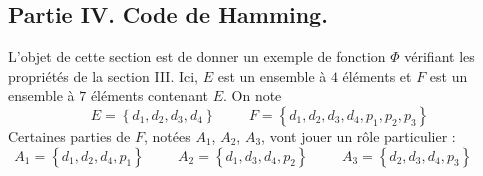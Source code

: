 \subsection*{Partie IV. Code de Hamming.}
L'objet de cette section est de donner un exemple de fonction $\Phi$ vérifiant les propriétés de la section III. Ici, $E$ est un ensemble à $4$ éléments et $F$ est un ensemble à $7$ éléments contenant $E$. On note
\begin{displaymath}
 E = \left\lbrace d_1,d_2,d_3,d_4\right\rbrace \hspace{1cm} F= \left\lbrace d_1,d_2,d_3,d_4,p_1,p_2,p_3\right\rbrace 
\end{displaymath}
Certaines parties de $F$, notées $A_1$, $A_2$, $A_3$, vont jouer un rôle particulier :
\begin{displaymath}
A_1 = \left\lbrace d_1,d_2,d_4,p_1\right\rbrace \hspace{1cm}
A_2 = \left\lbrace d_1,d_3,d_4,p_2\right\rbrace \hspace{1cm}
A_3 = \left\lbrace d_2,d_3,d_4,p_3\right\rbrace \hspace{1cm}
\end{displaymath}

